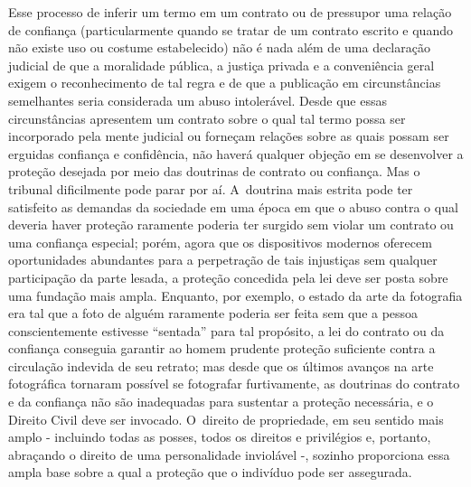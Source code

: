 Esse processo de inferir um termo em um contrato ou de pressupor uma
relação de confiança (particularmente quando se tratar de um contrato
escrito e quando não existe uso ou costume estabelecido) não é nada além
de uma declaração judicial de que a moralidade pública, a justiça
privada e a conveniência geral exigem o reconhecimento de tal regra e de
que a publicação em circunstâncias semelhantes seria considerada um
abuso intolerável. Desde que essas circunstâncias apresentem um contrato
sobre o qual tal termo possa ser incorporado pela mente judicial ou
forneçam relações sobre as quais possam ser erguidas confiança e
confidência, não haverá qualquer objeção em se desenvolver a proteção
desejada por meio das doutrinas de contrato ou confiança. Mas o tribunal
dificilmente pode parar por aí. A~doutrina mais estrita pode ter
satisfeito as demandas da sociedade em uma época em que o abuso contra o
qual deveria haver proteção raramente poderia ter surgido sem violar um
contrato ou uma confiança especial; porém, agora que os dispositivos
modernos oferecem oportunidades abundantes para a perpetração de tais
injustiças sem qualquer participação da parte lesada, a proteção
concedida pela lei deve ser posta sobre uma fundação mais ampla.
Enquanto, por exemplo, o estado da arte da fotografia era tal que a foto
de alguém raramente poderia ser feita sem que a pessoa conscientemente
estivesse ``sentada'' para tal propósito, a lei do contrato ou da
confiança conseguia garantir ao homem prudente proteção suficiente
contra a circulação indevida de seu retrato; mas desde que os últimos
avanços na arte fotográfica tornaram possível se fotografar
furtivamente, as doutrinas do contrato e da confiança não são
inadequadas para sustentar a proteção necessária, e o Direito Civil deve
ser invocado. O~direito de propriedade, em seu sentido mais amplo -
incluindo todas as posses, todos os direitos e privilégios e, portanto,
abraçando o direito de uma personalidade inviolável -, sozinho
proporciona essa ampla base sobre a qual a proteção que o indivíduo pode
ser assegurada.

